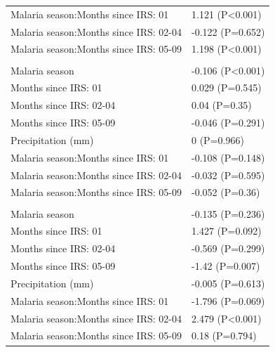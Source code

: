 \documentclass[]{article}
\begin{document}
\begin{table}
\begin{tabular}[t]{ll}
\hspace{1em}Malaria season:Months since IRS: 01 & 1.121 (P<0.001)\\
\hspace{1em}Malaria season:Months since IRS: 02-04 & -0.122 (P=0.652)\\
\hspace{1em}Malaria season:Months since IRS: 05-09 & 1.198 (P<0.001)\\
\addlinespace[1.5em]
\multicolumn{2}{l}{\textbf{Temporary field worker}}\\
\hspace{1em}Malaria season & -0.106 (P<0.001)\\
\hspace{1em}Months since IRS: 01 & 0.029 (P=0.545)\\
\hspace{1em}Months since IRS: 02-04 & 0.04 (P=0.35)\\
\hspace{1em}Months since IRS: 05-09 & -0.046 (P=0.291)\\
\hspace{1em}Precipitation (mm) & 0 (P=0.966)\\
\hspace{1em}Malaria season:Months since IRS: 01 & -0.108 (P=0.148)\\
\hspace{1em}Malaria season:Months since IRS: 02-04 & -0.032 (P=0.595)\\
\hspace{1em}Malaria season:Months since IRS: 05-09 & -0.052 (P=0.36)\\
\addlinespace[1.5em]
\multicolumn{2}{l}{\textbf{Temporary not field worker}}\\
\hspace{1em}Malaria season & -0.135 (P=0.236)\\
\hspace{1em}Months since IRS: 01 & 1.427 (P=0.092)\\
\hspace{1em}Months since IRS: 02-04 & -0.569 (P=0.299)\\
\hspace{1em}Months since IRS: 05-09 & -1.42 (P=0.007)\\
\hspace{1em}Precipitation (mm) & -0.005 (P=0.613)\\
\hspace{1em}Malaria season:Months since IRS: 01 & -1.796 (P=0.069)\\
\hspace{1em}Malaria season:Months since IRS: 02-04 & 2.479 (P<0.001)\\
\hspace{1em}Malaria season:Months since IRS: 05-09 & 0.18 (P=0.794)\\
\bottomrule
\end{tabular}
\end{table}
\end{document}
